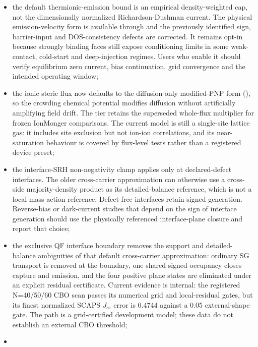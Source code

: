 \documentclass[
  11pt,
  american,
]{report}
\providecommand{\tightlist}{%
  \setlength{\itemsep}{0pt}\setlength{\parskip}{0pt}}
\begin{document}
\begin{itemize}
\tightlist
\item
  the default thermionic-emission bound is an empirical density-weighted
  cap, not the dimensionally normalized Richardson-Dushman current. The
  physical emission-velocity form is available through
   and the previously identified sign,
  barrier-input and DOS-consistency defects are corrected. It remains
  opt-in because strongly binding faces still expose conditioning limits
  in some weak-contact, cold-start and deep-injection regimes. Users who
  enable it should verify equilibrium zero current, bias continuation,
  grid convergence and the intended operating window;
\item
  the ionic steric flux now defaults to the diffusion-only modified-PNP
  form (), so the crowding chemical
  potential modifies diffusion without artificially amplifying field
  drift. The  tier retains the superseded whole-flux
  multiplier for frozen IonMonger comparisons. The current model is
  still a single-site lattice gas: it includes site exclusion but not
  ion-ion correlations, and its near-saturation behaviour is covered by
  flux-level tests rather than a registered device preset;
\item
  the interface-SRH non-negativity clamp applies only at declared-defect
  interfaces. The older cross-carrier approximation can otherwise use a
  cross-side majority-density product as its detailed-balance reference,
  which is not a local mass-action reference. Defect-free interfaces
  retain signed generation. Reverse-bias or dark-current studies that
  depend on the sign of interface generation should use the physically
  referenced interface-plane closure and report that choice;
\item
  the exclusive QF interface boundary removes the support and
  detailed-balance ambiguities of that default cross-carrier
  approximation: ordinary SG transport is removed at the boundary, one
  shared signed occupancy closes capture and emission, and the four
  positive plane states are eliminated under an explicit residual
  certificate. Current evidence is internal: the registered N=40/50/60
  CBO scan passes its numerical grid and local-residual gates, but its
  finest normalized SCAPS \(J_\mathrm{sc}\) error is 0.4744 against a
  0.05 external-shape gate. The path is a grid-certified development
  model; these data do not establish an external CBO threshold;
\item

\end{itemize}
\end{document}
